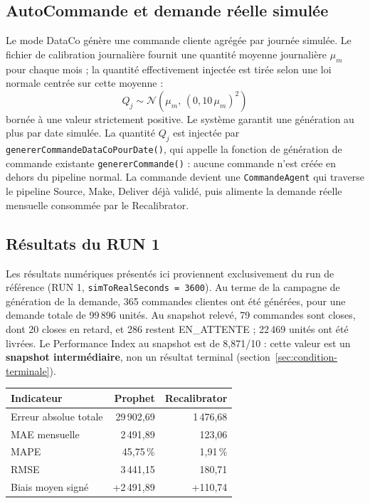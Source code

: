 \documentclass[11pt,a4paper]{article}
\newcommand{\code}[1]{\texttt{#1}}
\begin{document}
\subsection{AutoCommande et demande réelle simulée}

Le mode DataCo génère une commande cliente agrégée par journée simulée. Le fichier de calibration journalière fournit une quantité moyenne journalière $\mu_m$ pour chaque mois ; la quantité effectivement injectée est tirée selon une loi normale centrée sur cette moyenne :
\[
Q_j \sim \mathcal{N}\!\left(\mu_m,\,(0{,}10\,\mu_m)^2\right)
\]
bornée à une valeur strictement positive. Le système garantit une génération au plus par date simulée. La quantité $Q_j$ est injectée par \code{genererCommandeDataCoPourDate()}, qui appelle la fonction de génération de commande existante \code{genererCommande()} : aucune commande n'est créée en dehors du pipeline normal. La commande devient une \code{CommandeAgent} qui traverse le pipeline Source, Make, Deliver déjà validé, puis alimente la demande réelle mensuelle consommée par le Recalibrator.

\subsection{Résultats du RUN 1}

Les résultats numériques présentés ici proviennent exclusivement du run de référence (RUN 1, \code{simToRealSeconds = 3600}). Au terme de la campagne de génération de la demande, 365 commandes clientes ont été générées, pour une demande totale de 99\,896 unités. Au snapshot relevé, 79 commandes sont closes, dont 20 closes en retard, et 286 restent EN\_ATTENTE ; 22\,469 unités ont été livrées. Le Performance Index au snapshot est de 8,871/10 : cette valeur est un \textbf{snapshot intermédiaire}, non un résultat terminal (section~\ref{sec:condition-terminale}).

\begin{center}
\small
\begin{tabular}{lrr}
\toprule
Indicateur & Prophet & Recalibrator \\
\midrule
Erreur absolue totale & 29\,902,69 & 1\,476,68 \\
MAE mensuelle & 2\,491,89 & 123,06 \\
MAPE & 45,75\,\% & 1,91\,\% \\
RMSE & 3\,441,15 & 180,71 \\
Biais moyen signé & +2\,491,89 & +110,74 \\
\bottomrule
\end{tabular}
\end{center}
\end{document}
